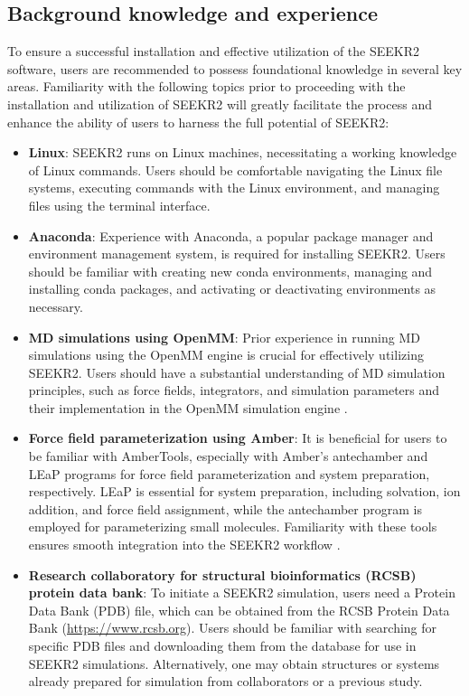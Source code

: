 \documentclass[9pt,training,pubversion]{livecoms}
\newcommand{\rcsblink}
{\url{https://www.rcsb.org}}
\begin{document}
\subsection{Background knowledge and experience}
\vspace{2mm}

\noindent To ensure a successful installation and effective utilization of the SEEKR2 software, users are recommended to possess foundational knowledge in several key areas. Familiarity with the following topics  prior to  proceeding with the installation and utilization of SEEKR2 will greatly facilitate the process and enhance the ability of users to harness the full potential of SEEKR2:

\begin{itemize}

\item \textbf{Linux}: SEEKR2 runs on Linux machines, necessitating a working knowledge of Linux commands. Users should be comfortable navigating the Linux file systems, executing commands with the Linux environment, and managing files using the terminal interface.

\item \textbf{Anaconda}: Experience with Anaconda, a popular package manager and environment management system, is required for installing SEEKR2. Users should be familiar with creating new conda environments, managing and installing conda packages, and activating or deactivating environments as necessary.

\item \textbf{MD simulations using OpenMM}: Prior experience in running MD simulations using the OpenMM engine is crucial for effectively utilizing SEEKR2. Users should have a substantial understanding of MD simulation principles, such as force fields, integrators, and simulation parameters and their implementation in the OpenMM simulation engine \cite{eastman2017openmm}.

\item \textbf{Force field parameterization using Amber}: It is beneficial for users to be familiar with AmberTools, especially with Amber's antechamber and LEaP programs for force field parameterization and system preparation, respectively. LEaP is essential for system preparation, including solvation, ion addition, and force field assignment, while the antechamber program is employed for parameterizing small molecules. Familiarity with these tools ensures smooth integration into the SEEKR2 workflow \cite{wang2001antechamber, salomon2013overview}.

\item \textbf{Research collaboratory for structural bioinformatics (RCSB) protein data bank}: To initiate a SEEKR2 simulation, users need a Protein Data Bank (PDB) file, which can be obtained from the RCSB Protein Data Bank (\rcsblink). Users should be familiar with searching for specific PDB files and downloading them from the database for use in SEEKR2 simulations. Alternatively, one may obtain structures or systems already prepared for simulation from collaborators or a previous study.

\end{itemize}
\end{document}
